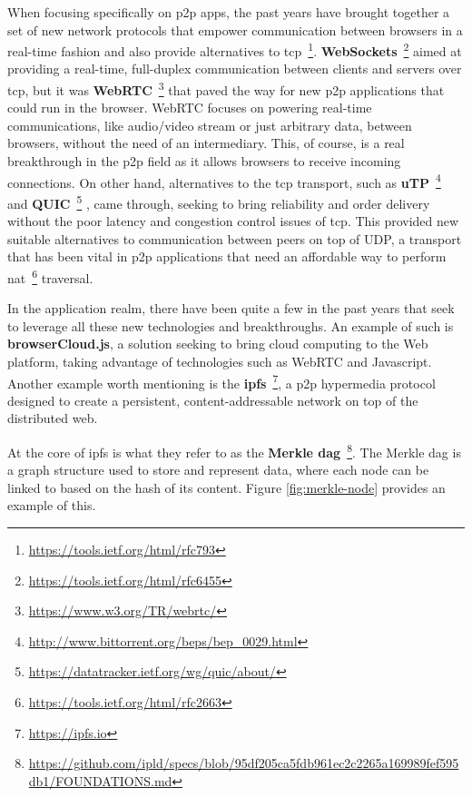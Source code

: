 When focusing specifically on \acrshort{p2p} apps, the past years have brought
together a set of new network protocols that empower communication between
browsers in a real-time fashion and also provide alternatives to
\acrshort{tcp}~\footnote{\url{https://tools.ietf.org/html/rfc793}}.
\textbf{WebSockets}~\footnote{\url{https://tools.ietf.org/html/rfc6455}} aimed at
providing a real-time, full-duplex communication between clients and servers
over \acrshort{tcp}, but it was
\textbf{WebRTC}~\footnote{\url{https://www.w3.org/TR/webrtc/}} that paved the way for
new \acrshort{p2p} applications that could run in the browser. WebRTC focuses
on powering real-time communications, like audio/video stream or just arbitrary
data, between browsers, without the need of an intermediary. This, of course,
is a real breakthrough in the \acrshort{p2p} field as it allows browsers to
receive incoming connections. On other hand, alternatives to the \acrshort{tcp}
transport, such as
\textbf{uTP}~\footnote{\url{http://www.bittorrent.org/beps/bep\_0029.html}} and
\textbf{QUIC}~\footnote{\url{https://datatracker.ietf.org/wg/quic/about/}} , came
through, seeking to bring reliability and order delivery without the poor
latency and congestion control issues of \acrshort{tcp}. This provided new
suitable alternatives to communication between peers on top of UDP, a transport
that has been vital in \acrshort{p2p} applications that need an affordable way
to perform \acrshort{nat}~\footnote{\url{https://tools.ietf.org/html/rfc2663}}
traversal.

In the application realm, there have been quite a few in the past years that
seek to leverage all these new technologies and breakthroughs. An example of
such is \textbf{browserCloud.js}\cite{Dias2018}, a solution seeking to bring
cloud computing to the Web platform, taking advantage of technologies such as
WebRTC and Javascript. Another example worth mentioning is the
\textbf{\acrfull{ipfs}}~\footnote{\url{https://ipfs.io}}, a \acrshort{p2p}
hypermedia protocol designed to create a persistent, content-addressable
network on top of the distributed web.

At the core of \acrshort{ipfs} is what they refer to as the \textbf{Merkle
\acrshort{dag}}~\footnote{\url{https://github.com/ipld/specs/blob/95df205ca5fdb961ec2c2265a169989fef595db1/FOUNDATIONS.md}}.
The Merkle \acrshort{dag} is a graph structure used to store and represent data, where
each node can be linked to based on the hash of its content. Figure
\ref{fig:merkle-node} provides an example of this. 

